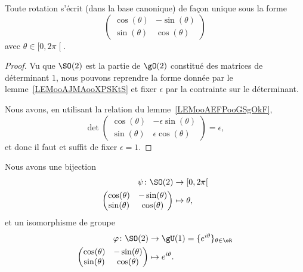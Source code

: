 \begin{lemma}       \label{LEMooHRESooQTrpMz}
    Toute rotation s'écrit (dans la base canonique) de façon unique sous la forme
    \begin{equation}
        \begin{pmatrix}
            \cos(\theta)    &   -\sin(\theta)    \\
            \sin(\theta)    &   \cos(\theta)
        \end{pmatrix}
    \end{equation}
    avec \( \theta\in\mathopen[ 0 , 2\pi \mathclose[\).
\end{lemma}

\begin{proof}
    Vu que \( \SO(2)\) est la partie de \( \gO(2)\) constitué des matrices de déterminant \( 1\), nous pouvons reprendre la forme donnée par le lemme~\ref{LEMooAJMAooXPSKtS} et fixer \( \epsilon\) par la contrainte sur le déterminant.

    Nous avons, en utilisant la relation du lemme~\ref{LEMooAEFPooGSgOkF},
    \begin{equation}
        \det\begin{pmatrix}
            \cos(\theta)    &   -\epsilon\sin(\theta)    \\
            \sin(\theta)    &   \epsilon\cos(\theta)
        \end{pmatrix}=\epsilon,
    \end{equation}
    et donc il faut et suffit de fixer \( \epsilon=1\).
\end{proof}

\begin{corollary}        \label{CORooGGVUooLQYGET}
    Nous avons une bijection
    \begin{equation}
        \begin{aligned}
            \psi\colon \SO(2)&\to \mathopen[ 0 , 2\pi \mathclose[ \\
        \begin{pmatrix}
            \cos(\theta)    &   -\sin(\theta)    \\
            \sin(\theta)    &   \cos(\theta)
        \end{pmatrix}
              &\mapsto \theta,
        \end{aligned}
    \end{equation}
    et un isomorphisme de groupe
    \begin{equation}
        \begin{aligned}
            \varphi\colon \SO(2)&\to \gU(1)=\{  e^{i\theta} \}_{\theta\in \eR} \\
        \begin{pmatrix}
            \cos(\theta)    &   -\sin(\theta)    \\
            \sin(\theta)    &   \cos(\theta)
        \end{pmatrix}
        &\mapsto  e^{i\theta}.
        \end{aligned}
    \end{equation}
\end{corollary}

